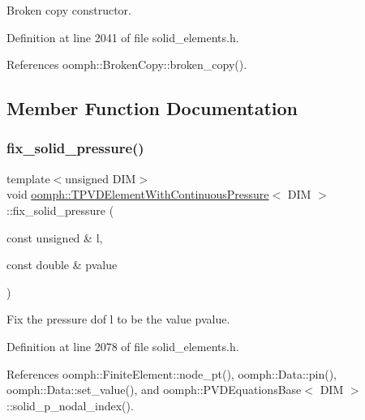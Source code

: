 Broken copy constructor. 



Definition at line 2041 of file solid\+\_\+elements.\+h.



References oomph\+::\+Broken\+Copy\+::broken\+\_\+copy().



\subsection{Member Function Documentation}
\mbox{\label{classoomph_1_1TPVDElementWithContinuousPressure_a6f45a094fc941c13ad8e0fc448eea782}} 
\subsubsection{\texorpdfstring{fix\+\_\+solid\+\_\+pressure()}{fix\_solid\_pressure()}}
{\footnotesize\ttfamily template$<$unsigned D\+IM$>$ \\
void \hyperlink{classoomph_1_1TPVDElementWithContinuousPressure}{oomph\+::\+T\+P\+V\+D\+Element\+With\+Continuous\+Pressure}$<$ D\+IM $>$\+::fix\+\_\+solid\+\_\+pressure (\begin{DoxyParamCaption}\item[{const unsigned \&}]{l,  }\item[{const double \&}]{pvalue }\end{DoxyParamCaption})\hspace{0.3cm}{\ttfamily [inline]}}



Fix the pressure dof l to be the value pvalue. 



Definition at line 2078 of file solid\+\_\+elements.\+h.



References oomph\+::\+Finite\+Element\+::node\+\_\+pt(), oomph\+::\+Data\+::pin(), oomph\+::\+Data\+::set\+\_\+value(), and oomph\+::\+P\+V\+D\+Equations\+Base$<$ D\+I\+M $>$\+::solid\+\_\+p\+\_\+nodal\+\_\+index().

